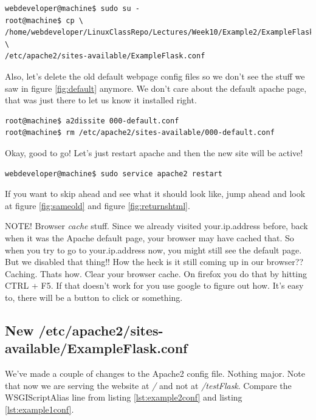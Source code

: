 \documentclass[10pt]{article}
\begin{document}
\pagebreak

\begin{lstlisting}[style=term, caption=Get the configuration file]
webdeveloper@machine$ sudo su -
root@machine$ cp \
/home/webdeveloper/LinuxClassRepo/Lectures/Week10/Example2/ExampleFlask.conf \
/etc/apache2/sites-available/ExampleFlask.conf
\end{lstlisting}


Also, let's delete the old default webpage config files so we don't see the
stuff we saw in figure \ref{fig:default} anymore. We don't care about the
default apache page, that was just there to let us know it installed right.

\begin{lstlisting}[style=term,caption=get rid of default site]
root@machine$ a2dissite 000-default.conf
root@machine$ rm /etc/apache2/sites-available/000-default.conf
\end{lstlisting}

Okay, good to go! Let's just restart apache and then the new site will be
active!

\begin{lstlisting}[style=term, caption=Restart the apache2 service.]
webdeveloper@machine$ sudo service apache2 restart
\end{lstlisting}

If you want to skip ahead and see what it should look like, jump ahead and look
at figure \ref{fig:sameold} and figure \ref{fig:returnshtml}.

{\Large \color{red} NOTE! Browser \textit{cache} stuff. Since we already visited
your.ip.address before, back when it was the Apache default page, your browser
may have cached that. So when you try to go to your.ip.address now, you might
still see the default page. But we disabled that thing!! How the heck is it
still coming up in our browser?? Caching. Thats how. Clear your browser cache.
On firefox you do that by hitting CTRL + F5. If that doesn't work for you use
google to figure out how. It's easy to, there will be a button to click or
something. }


\subsection{New /etc/apache2/sites-available/ExampleFlask.conf}
We've made a couple of changes to the Apache2 config file. Nothing major. 
Note that now we are serving the website at \textit{/} and not at
\textit{/testFlask}. Compare the WSGIScriptAlias line from listing
\ref{lst:example2conf} and listing \ref{lst:example1conf}. 
 
\end{document}
